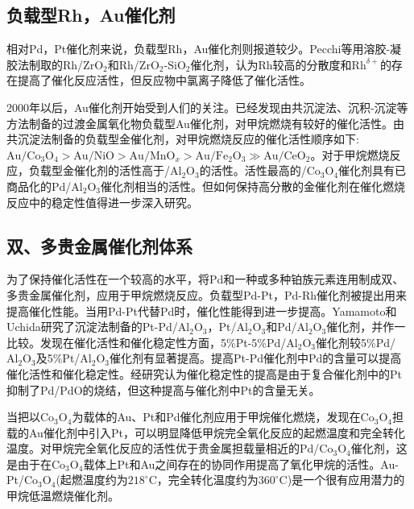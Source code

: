 \subsection{负载型\rm{Rh}，\rm{Au}催化剂}
相对\textrm{Pd}，\textrm{Pt}催化剂来说，负载型\textrm{Rh}\cite{CataD83-71_2003}，\textrm{Au}催化剂则报道较少。\textrm{Pecchi}等\cite{JCTB74-897_1999}用溶胶-凝胶法制取的\textrm{Rh}/$\mathrm{ZrO}_2$和\textrm{Rh}/$\mathrm{ZrO}_2$-$\mathrm{SiO}_2$催化剂，认为\textrm{Rh}较高的分散度和$\mathrm{Rh}^{\delta+}$的存在提高了催化反应活性，但反应物中氯离子降低了催化活性。

2000年以后，\textrm{Au}催化剂开始受到人们的关注。已经发现由共沉淀法、沉积-沉淀等方法制备的过渡金属氧化物负载型\textrm{Au}催化剂，对甲烷燃烧有较好的催化活性\cite{JCata191-430_2000,CataD64-69_2001}。由共沉淀法制备的负载型金催化剂，对甲烷燃烧反应的催化活性顺序如下:~$\mathrm{Au}/\mathrm{Co}_3\mathrm{O}_4>\mathrm{Au}/\mathrm{NiO}>\mathrm{Au}/\mathrm{MnO}_x>\mathrm{Au}/\mathrm{Fe}_2\mathrm{O}_3\gg\mathrm{Au}/\mathrm{CeO}_2$。对于甲烷燃烧反应，负载型金催化剂的活性高于/$\mathrm{Al}_2\mathrm{O}_3$的活性。活性最高的/$\mathrm{Co}_3\mathrm{O}_4$催化剂具有已商品化的\textrm{Pd}/$\mathrm{Al}_2\mathrm{O}_3$催化剂相当的活性。但如何保持高分散的金催化剂在催化燃烧反应中的稳定性值得进一步深入研究。

\subsection{双、多贵金属催化剂体系}
为了保持催化活性在一个较高的水平，将\textrm{Pd}和一种或多种铂族元素连用制成双、多贵金属催化剂，应用于甲烷燃烧反应。负载型\textrm{Pd}-\textrm{Pt}，\textrm{Pd}-\textrm{Rh}\cite{ACA226-281_2002,CataT83-265_2003}催化剂被提出用来提高催化性能。当用\textrm{Pd}-\textrm{Pt}代替\textrm{Pd}时，催化性能得到进一步提高。\textrm{Yamamoto}和\textrm{Uchida}\cite{CataD45-147_1998}研究了沉淀法制备的\textrm{Pt}-\textrm{Pd}/$\mathrm{Al}_2\mathrm{O}_3$，Pt/$\mathrm{Al}_2\mathrm{O}_3$和Pd/$\mathrm{Al}_2\mathrm{O}_3$催化剂，并作一比较。发现在催化活性和催化稳定性方面，5\%\textrm{Pt}-5\%\textrm{Pd}/$\mathrm{Al}_2\mathrm{O}_3$催化剂较5\%\textrm{Pd}/$\mathrm{Al}_2\mathrm{O}_3$及5\%\textrm{Pt}/$\mathrm{Al}_2\mathrm{O}_3$催化剂有显著提高。提高\textrm{Pt}-\textrm{Pd}催化剂中\textrm{Pd}的含量可以提高催化活性和催化稳定性。经研究认为催化稳定性的提高是由于复合催化剂中的\textrm{Pt}抑制了\textrm{Pd}/\textrm{PdO}的烧结，但这种提高与催化剂中\textrm{Pt}的含量无关。

当把以$\mathrm{Co}_3\mathrm{O}_4$为载体的\textrm{Au}、\textrm{Pt}和\textrm{Pd}催化剂应用于甲烷催化燃烧\cite{ACB31-L1_2001}，发现在$\mathrm{Co}_3\mathrm{O}_4$担载的\textrm{Au}催化剂中引入\textrm{Pt}，可以明显降低甲烷完全氧化反应的起燃温度和完全转化温度。对甲烷完全氧化反应的活性优于贵金属担载量相近的\textrm{Pd}/$\mathrm{Co}_3\mathrm{O}_4$催化剂，这是由于在$\mathrm{Co}_3\mathrm{O}_4$载体上\textrm{Pt}和\textrm{Au}之间存在的协同作用提高了氧化甲烷的活性。\textrm{Au}-\textrm{Pt}/$\mathrm{Co}_3\mathrm{O}_4$(起燃温度约为$218^{\circ}\mathrm{C}$，完全转化温度约为$360^{\circ}\mathrm{C}$)是一个很有应用潜力的甲烷低温燃烧催化剂。

